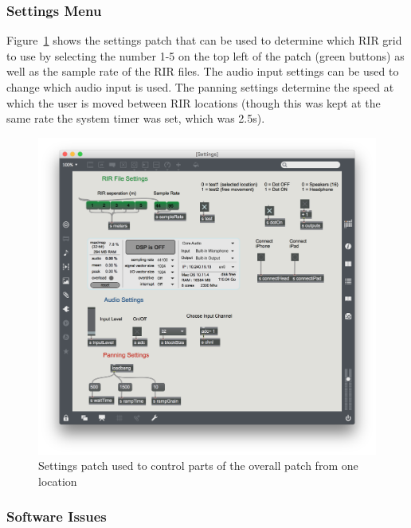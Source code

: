 \documentclass[../../main.tex]{subfiles}
\begin{document}
	\subsubsection{Settings Menu}

	Figure~\ref{settings} shows the settings patch that can be used to determine which \ac{RIR} grid to use by selecting the number 1-5 on the top left of the patch (green buttons) as well as the sample rate of the \ac{RIR} files. The audio input settings can be used to change which audio input is used. The panning settings determine the speed at which the user is moved between \ac{RIR} locations (though this was kept at the same rate the system timer was set, which was 2.5s).

		\begin{figure}[t]
			\centerline{\includegraphics[scale = 0.4]{Sections/Implementation/Max/images/settings.png}}
			\caption{Settings patch used to control parts of the overall patch from one location}
			\label{settings}
		\end{figure}

		\subsubsection{Software Issues}
	\label{iteration3Issues}
\end{document}
